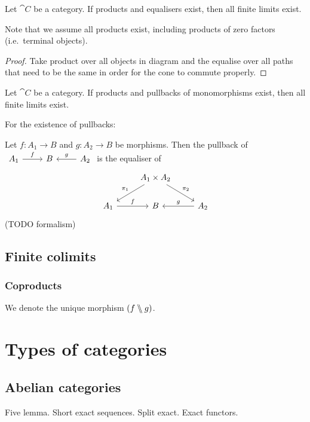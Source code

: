 \begin{lemma}

\end{lemma}

\begin{proposition}
Let $\cat{C}$ be a category. If products and equalisers exist, then all finite limits exist.
\end{proposition}
Note that we assume all products exist, including products of zero factors (i.e.\ terminal objects).
\begin{proof}
Take product over all objects in diagram and the equalise over all paths that need to be the same in order for the cone to commute properly.
\end{proof}
\begin{corollary} \label{productsMonicPullbacksComplete}
Let $\cat{C}$ be a category. If products and pullbacks of monomorphisms exist, then all finite limits exist.
\end{corollary}

\begin{example}
For the existence of pullbacks:

Let $f: A_1 \to B$ and $g: A_2 \to B$ be morphisms. Then the pullback of $\begin{tikzcd}
A_1 \ar[r, "f"] & B & \ar[l, swap, "g"] A_2
\end{tikzcd}$ is the equaliser of
\[ \begin{tikzcd}
& A_1 \times A_2 \ar[dl, swap, "\proj_1"] \ar[dr, "\proj_2"] & \\
A_1 \ar[r, "f"] & B & \ar[l, swap, "g"] A_2
\end{tikzcd} \]
(TODO formalism)

\end{example}

\section{Finite colimits}
\subsection{Coproducts}

We denote the unique morphism $(f \bbslash g)$.


\chapter{Types of categories}
\section{Abelian categories}
Five lemma. Short exact sequences. Split exact. Exact functors.


